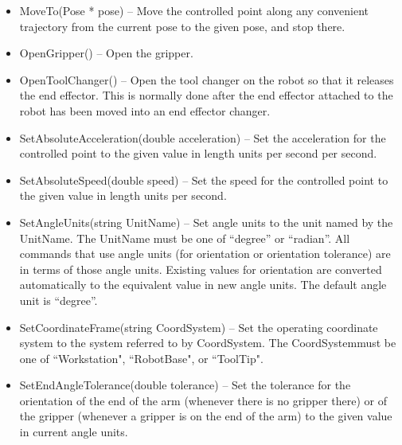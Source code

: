 \begin{itemize}
\item \sf MoveTo(Pose * pose) \rm -- Move the controlled point along any
  convenient trajectory from the current pose to the given \sf pose\rm,
  and stop there.\\

\item \sf OpenGripper() \rm -- Open the gripper.\\

\item \sf OpenToolChanger() \rm -- Open the tool changer on the robot so
  that it releases the end effector.  This is normally done after the end
  effector attached to the robot has been moved into an end effector
  changer.\\

\item \sf SetAbsoluteAcceleration(double acceleration) \rm -- Set the
  acceleration for the controlled point to the given value in length units
  per second per second.\\

\item \sf SetAbsoluteSpeed(double speed) \rm -- Set the speed for the
  controlled point to the given value in length units per second.\\

\item \sf SetAngleUnits(string UnitName) \rm -- Set angle units to the unit
  named by the \sf UnitName\rm.  The \sf UnitName \rm must be one of
  ``degree'' or ``radian''. All commands that use angle units (for
  orientation or orientation tolerance) are in terms of those angle
  units. Existing values for orientation are converted automatically to the
  equivalent value in new angle units.  The default angle unit is
  ``degree''.\\

\item \sf SetCoordinateFrame(string CoordSystem) \rm -- Set the
operating coordinate system to the system referred to by
\sf CoordSystem\rm. The \sf CoordSystem\rm must be one of
``Workstation", ``RobotBase", or ``ToolTip".

\item \sf SetEndAngleTolerance(double tolerance) \rm -- Set the tolerance
  for the orientation of the end of the arm (whenever there is no gripper
  there) or of the gripper (whenever a gripper is on the end of the arm) to
  the given value in current angle units.\\


\end{itemize}
